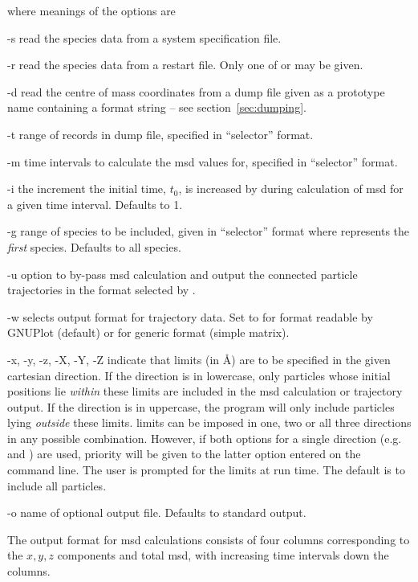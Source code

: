 \documentclass[a4paper,twoside]{report}
\begin{document}
where meanings of the options are
\begin{Argdescription}
\item[-s] read the species data from a system specification file.
\item[-r] read the species data from a restart file. Only one of
   or  may be given.
\item[-d] read the centre of mass coordinates from a dump file given as a
prototype name containing a  format string -- see
section~\ref{sec:dumping}. 
\item[-t] range of records in dump file, specified in ``selector'' format.
\item[-m] time intervals to calculate the msd values for, specified in
  ``selector'' format.
\item[-i] the increment the initial time, $t_0$, is increased by during
calculation of msd for a given time interval. Defaults to 1.
\item[-g] range of species to be included, given in ``selector''
  format where  represents the \emph{first} species. Defaults
  to all species. 
\item[-u] option to by-pass msd calculation and output the connected particle
trajectories in the format selected by . 
\item[-w] selects output format for trajectory data. Set to 
   for format readable by GNUPlot (default) or
   for generic format (simple matrix).
\item[-x, -y, -z, -X, -Y, -Z] indicate that limits (in {\AA}) are to be
  specified in the given cartesian direction. If the direction is in
  lowercase, only particles whose initial positions lie \emph{within}
  these limits are included in the msd calculation or trajectory
  output. If the direction is in uppercase, the program will only
  include particles lying \emph{outside} these limits. limits can be
  imposed in one, two or all three directions in any possible
  combination. However, if both options for a single direction (e.g.
   and ) are used, priority will be given to the
  latter option entered on the command line. The user is prompted for
  the limits at run time. The default is to include all particles.
\item[-o] name of optional output file. Defaults to standard output.
\end{Argdescription}


The output format for msd calculations consists of four columns
corresponding to the $x, y, z$ components and total msd, with
increasing time intervals down the columns.
\end{document}
